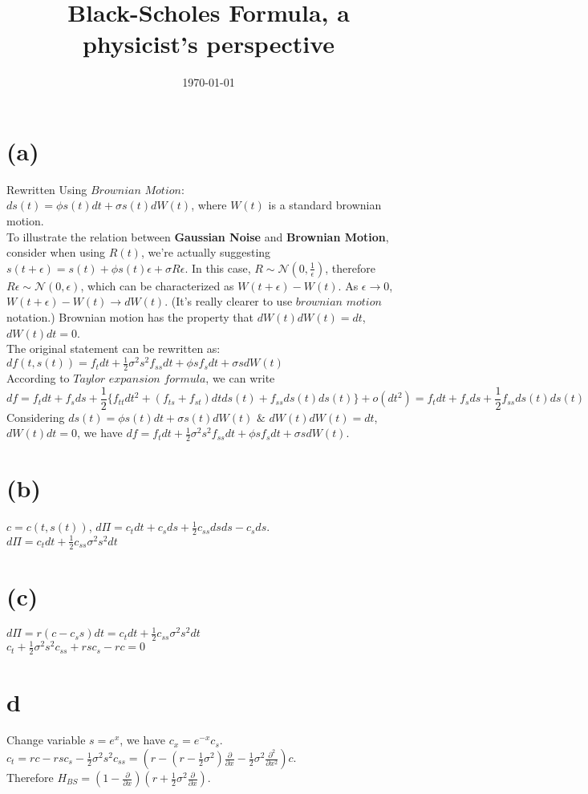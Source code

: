 \documentclass[11pt,a4paper]{paper}
\title{Black-Scholes Formula, a physicist's perspective}
\author{}
\date{\today}
\begin{document}
\maketitle

\section{(a)}
Rewritten Using $Brownian$ $Motion$: \\$ds(t) = \phi s(t) dt + \sigma s(t) dW(t)$, where $W(t)$ is a standard brownian motion.\\\indent To illustrate the relation between \textbf{Gaussian Noise} and \textbf{Brownian Motion}, consider when using $R(t)$, we're actually suggesting $s(t + \epsilon) = s(t) + \phi s(t) \epsilon + \sigma R \epsilon$. In this case, $R \sim \mathcal{N}(0, \frac{1}{\epsilon})$, therefore $R \epsilon \sim \mathcal{N}(0, \epsilon)$, which can be characterized as $W(t + \epsilon) - W(t)$. As $\epsilon \rightarrow 0$, $W(t + \epsilon) - W(t) \rightarrow dW(t)$. (It's really clearer to use $brownian$ $motion$ notation.) Brownian motion has the property that $dW(t)dW(t) = dt$, $dW(t) dt = 0$.\\
\indent The original statement can be rewritten as: \\$df(t, s(t)) = f_t dt + \frac{1}{2}\sigma^2s^2f_{ss}dt + \phi s f_s dt + \sigma s dW(t)$\\
\indent According to $Taylor$ $expansion$ $formula$, we can write
\begin{equation} df = f_t dt + f_s ds + \frac{1}{2}\{f_{tt} dt^2 + (f_{ts} + f_{st})dt ds(t) + f_{ss} ds(t)ds(t) \} + o(dt^2) = f_t dt + f_s ds + \frac{1}{2} f_{ss} ds(t)ds(t)
\end{equation} 
\indent Considering $ds(t) = \phi s(t) dt + \sigma s(t) dW(t)$ $\&$ $dW(t)dW(t) = dt$, $dW(t) dt = 0$, we have $df = f_t dt + \frac{1}{2}\sigma^2s^2f_{ss}dt + \phi s f_s dt + \sigma s dW(t)$.

\section{(b)}
$c = c(t, s(t))$, $d\Pi = c_t dt + c_s ds + \frac{1}{2}c_{ss} ds ds - c_s ds$.\\
$d\Pi = c_t dt + \frac{1}{2} c_{ss} \sigma^2 s^2 dt$

\section{(c)}
$d\Pi = r(c - c_s s)dt = c_t dt + \frac{1}{2} c_{ss} \sigma^2 s^2 dt$\\
$c_t + \frac{1}{2}\sigma^2 s^2 c_{ss} + rsc_s - rc = 0$

\section{d}
Change variable $s = e^x$, we have $c_x = e^{-x}c_s$.\\
$c_t = rc - rsc_s - \frac{1}{2}\sigma^2 s^2 c_{ss} = (r - (r - \frac{1}{2}\sigma^2)\frac{\partial}{\partial x} - \frac{1}{2}\sigma^2 \frac{\partial^2}{\partial x^2}) c$.\\
\indent Therefore $H_{BS} = (1 - \frac{\partial}{\partial x})(r + \frac{1}{2} \sigma^2 \frac{\partial}{\partial x})$. 
\end{document}
